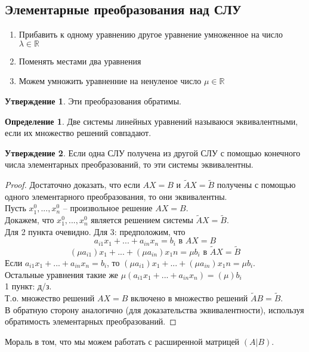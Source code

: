 \documentclass[a4paper, 12pt]{article}
\theoremstyle{definition}
\newtheorem*{definition}{Определение}
\newtheorem*{subtheorem}{Утверждение}
\begin{document}
    \subsection{Элементарные преобразования над СЛУ}
    \begin{enumerate}
        \item Прибавить к одному уравнению другое уравнение умноженное на число $\lambda \in \mathbb{R}$ 
        \item Поменять местами два уравнения
        \item Можем умножить уравненние на ненуленое число $\mu \in \mathbb{R}$ 
    \end{enumerate}
    \begin{subtheorem}
        Эти преобразования обратимы.
    \end{subtheorem}
    \begin{definition}
        Две системы линейных уравнений называюся эквивалентными, если их множество решений совпадают.
    \end{definition}
    \begin{subtheorem}
        Если одна СЛУ получена из другой СЛУ с помощью конечного числа элементарных преобразований, то эти системы эквивалентны.
    \end{subtheorem}
    \begin{proof}
        Достаточно доказать, что если $AX = B$ и $\widetilde{A}X = \widetilde{B}$ получены с помощью одного элементарного преобразования, то они эквивалентны.\\
        Пусть $x_1^0,...,x_n^0$ -- произвольное решение $AX = B$.\\
        Докажем, что $x_1^0,...,x_n^0$ является решением системы $\widetilde{A}X = \widetilde{B}$.\\
        Для 2 пункта очевидно.
        Для 3: предположим, что $$a_{i1}x_1 +...+ a_{in}x_n = b_i \text{ в } AX = B$$
        $$(\mu a_{i1})x_1 +...+ (\mu a_{in})x_1n = \mu b_i \text{  в } \widetilde{A}X = \widetilde{B}$$
        Если $a_{i1}x_1 +...+ a_{in}x_n = b_i$, то $(\mu a_{i1})x_1 +...+ (\mu a_{in})x_1n = \mu b_i$.\\
        Остальные уравнения такие же $\mu (a_{i1}x_1 +...+ a_{in}x_n) = (\mu)b_i$\\
        1 пункт: д/з.\\
        Т.о. множество решений $AX = B$ включено в множество решений $\widetilde{A}B = \widetilde{B}$.\\
        В обратную сторону аналогично (для доказательства эквивалентности), используя обратимость элементарных преобразований.
    
    \end{proof}
    Мораль в том, что мы можем работать с расширенной матрицей $(A|B)$.
\end{document}
